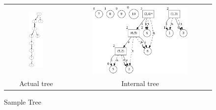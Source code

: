 \documentclass[a4paper, 11pt]{article}
\begin{document}
\begin{figure}[H]
\centering
\begin{tabular}{cc}
  \includegraphics[width=0.25\textwidth]{img/visualisations/test2/0.png} & \includegraphics[width=0.7\textwidth]{img/visualisations/test2/i0.png} \\
  Actual tree & Internal tree \\
\end{tabular}
\caption{Sample Tree}
\label{fig:10}
\end{figure}
\end{document}
